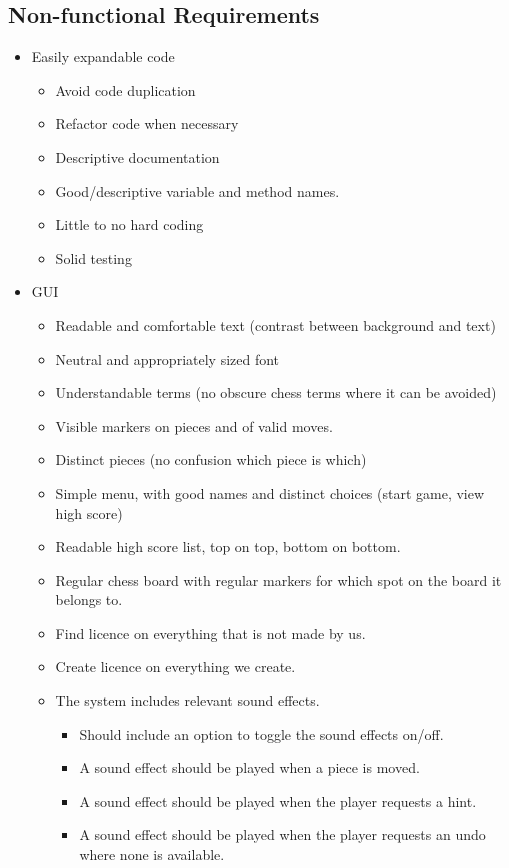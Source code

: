 \documentclass{article}
\begin{document}
\subsection{Non-functional Requirements}
\begin{itemize}
	\item Easily expandable code
	\begin{itemize}
		\item Avoid code duplication
		\item Refactor code when necessary 
		\item Descriptive documentation
		\item Good/descriptive variable and method names.
		\item Little to no hard coding
		\item Solid testing
	\end{itemize}
	\item GUI
	\begin{itemize}
		\item Readable and comfortable text (contrast between background and text)
		\item Neutral and appropriately sized font
		\item Understandable terms (no obscure chess terms where it can be avoided)
		\item Visible markers on pieces and of valid moves.
		\item Distinct pieces (no confusion which piece is which)
		\item Simple menu, with good names and distinct choices (start game, view high score)
		\item Readable high score list, top on top, bottom on bottom.
		\item Regular chess board with regular markers for which spot on the board it belongs to.
		\item Find licence on everything that is not made by us.
		\item Create licence on everything we create.
		\item The system includes relevant sound effects.
		\begin{itemize}
			\item Should include an option to toggle the sound effects on/off.
			\item  A sound effect should be played when a piece is moved. 
			\item A sound effect should be played when the player requests a hint.
			\item A sound effect should be played when the player requests an undo where none is available.

\end{itemize}
\end{itemize}
\end{itemize}
\end{document}
